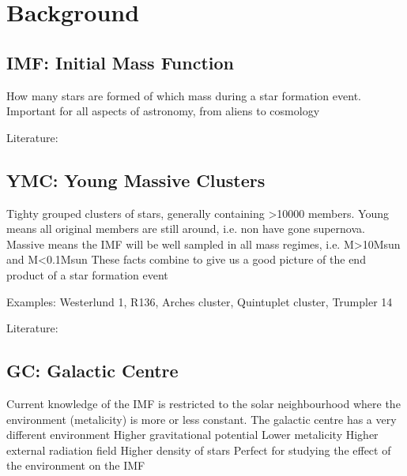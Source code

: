 \documentclass[letterpaper,10pt,english]{sphinxmanual}
\begin{document}
\section{Background}
\label{\detokenize{Project_Overview/Aims:background}}

\subsection{IMF: Initial Mass Function}
\label{\detokenize{Project_Overview/Aims:imf-initial-mass-function}}
\sphinxAtStartPar
How many stars are formed of which mass during a star formation event.
Important for all aspects of astronomy, from aliens to cosmology

\sphinxAtStartPar
Literature:


\subsection{YMC: Young Massive Clusters}
\label{\detokenize{Project_Overview/Aims:ymc-young-massive-clusters}}
\sphinxAtStartPar
Tighty grouped clusters of stars, generally containing \textgreater{}10000 members.
Young means all original members are still around, i.e. non have gone supernova.
Massive means the IMF will be well sampled in all mass regimes, i.e. M\textgreater{}10Msun and M\textless{}0.1Msun
These facts combine to give us a good picture of the end product of a star formation event

\sphinxAtStartPar
Examples: Westerlund 1, R136, Arches cluster, Quintuplet cluster, Trumpler 14

\sphinxAtStartPar
Literature:


\subsection{GC: Galactic Centre}
\label{\detokenize{Project_Overview/Aims:gc-galactic-centre}}
\sphinxAtStartPar
Current knowledge of the IMF is restricted to the solar neighbourhood where
the environment (metalicity) is more or less constant.
The galactic centre has a very different environment
\sphinxhyphen{} Higher gravitational potential
\sphinxhyphen{} Lower metalicity
\sphinxhyphen{} Higher external radiation field
\sphinxhyphen{} Higher density of stars
Perfect for studying the effect of the environment on the IMF
\end{document}

